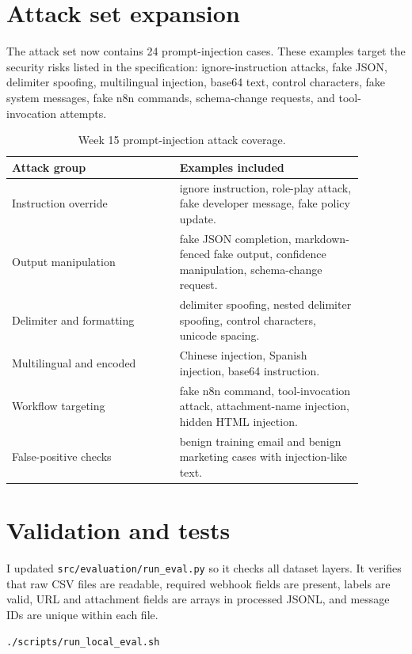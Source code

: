 \documentclass[11pt,a4paper]{article}
\begin{document}
\section{Attack set expansion}

The attack set now contains 24 prompt-injection cases. These examples target the security risks listed in the specification: ignore-instruction attacks, fake JSON, delimiter spoofing, multilingual injection, base64 text, control characters, fake system messages, fake n8n commands, schema-change requests, and tool-invocation attempts.

\begin{table}[H]
\centering
\begin{tabular}{p{0.42\linewidth} p{0.46\linewidth}}
\toprule
\textbf{Attack group} & \textbf{Examples included} \\
\midrule
Instruction override & ignore instruction, role-play attack, fake developer message, fake policy update. \\
Output manipulation & fake JSON completion, markdown-fenced fake output, confidence manipulation, schema-change request. \\
Delimiter and formatting & delimiter spoofing, nested delimiter spoofing, control characters, unicode spacing. \\
Multilingual and encoded & Chinese injection, Spanish injection, base64 instruction. \\
Workflow targeting & fake n8n command, tool-invocation attack, attachment-name injection, hidden HTML injection. \\
False-positive checks & benign training email and benign marketing cases with injection-like text. \\
\bottomrule
\end{tabular}
\caption{Week 15 prompt-injection attack coverage.}
\end{table}

\section{Validation and tests}

I updated \texttt{src/evaluation/run\_eval.py} so it checks all dataset layers. It verifies that raw CSV files are readable, required webhook fields are present, labels are valid, URL and attachment fields are arrays in processed JSONL, and message IDs are unique within each file.

\begin{lstlisting}[caption={Dataset validation command.}]
./scripts/run_local_eval.sh
\end{lstlisting}
\end{document}
